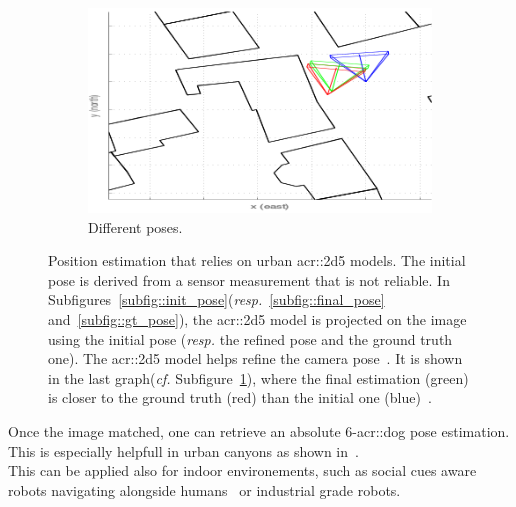 \begin{figure}[htpb]
\begin{subfigure}{.18\textwidth}
                \end{subfigure}
                \hfill
                \begin{subfigure}{.18\textwidth}
                    \begin{center}
                        \includegraphics[width=\textwidth]{images/3d_model_applications/pose_estimation/pose_viz}
                        \caption{\label{subfig::viz} Different poses.}
                    \end{center}
                \end{subfigure}
                \caption{
                    \label{fig::navigation} Position estimation that relies on urban \gls{acr::2d5} models.
                    The initial pose is derived from a sensor measurement that is not reliable.
                    In Subfigures~\ref{subfig::init_pose}(\textit{resp.}~\ref{subfig::final_pose} and~\ref{subfig::gt_pose}), the \gls{acr::2d5} model is projected on the image using the initial pose (\textit{resp.} the refined pose and the ground truth one).
                    The \gls{acr::2d5} model helps refine the camera pose~\parencite{armagan2017semantic}.
                    It is shown in the last graph(\textit{cf.} Subfigure~\ref{subfig::viz}), where the final estimation (green) is closer to the ground truth (red) than the initial one (blue)~\parencite{armagan2017semantic}.
                }
            \end{figure}
            Once the image matched, one can retrieve an absolute 6-\gls{acr::dog} pose estimation.
            This is especially helpfull in urban canyons as shown in~\textcite{piasco2018survey}.\\
            This can be applied also for indoor environements, such as social cues aware robots navigating alongside humans~\parencite{gupta2018social} or industrial grade robots\addref.
       
